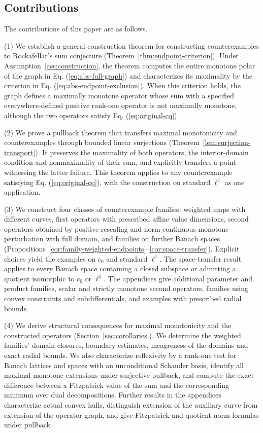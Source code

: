 \documentclass[11pt]{article}
\theoremstyle{definition}
\theoremstyle{remark}
\begin{document}
\subsection{Contributions}
The contributions of this paper are as follows. 

(1) We establish a general construction theorem for constructing counterexamples to Rockafellar's sum conjecture (Theorem~\ref{thm:endpoint-criterion}). Under Assumption~\ref{ass:construction}, the theorem computes the entire monotone polar of the graph in Eq. (\ref{eq:abs-full-graph}) and characterizes its maximality by the criterion in Eq. (\ref{eq:abs-endpoint-exclusion}). When this criterion holds, the graph defines a maximally monotone operator whose sum with a specified everywhere-defined positive rank-one operator is not maximally monotone, although the two operators satisfy Eq. (\ref{eq:original-cq}).

(2) We prove a pullback theorem that transfers maximal monotonicity and counterexamples through bounded linear surjections (Theorem~\ref{lem:surjection-transport}). It preserves the maximality of both operators, the interior-domain condition and nonmaximality of their sum, and explicitly transfers a point witnessing the latter failure. This theorem applies to any counterexample satisfying Eq. (\ref{eq:original-cq}), with the construction on standard $\ell^1$ as one application.

(3) We construct four classes of counterexample families: weighted maps with different curves, first operators with prescribed affine value dimensions, second operators obtained by positive rescaling and norm-continuous monotone perturbation with full domain, and families on further Banach spaces (Propositions~\ref{cor:family-weighted-endpoints}--\ref{cor:space-transfer}). Explicit choices yield the examples on $c_0$ and standard $\ell^1$. The space-transfer result applies to every Banach space containing a closed subspace or admitting a quotient isomorphic to $c_0$ or $\ell^1$. The appendices give additional parameter and product families, scalar and strictly monotone second operators, families using convex constraints and subdifferentials, and examples with prescribed radial bounds.

(4) We derive structural consequences for maximal monotonicity and the constructed operators (Section~\ref{sec:corollaries}). We determine the weighted families' domain closures, boundary estimates, meagreness of the domains and exact radial bounds. We also characterize reflexivity by a rank-one test for Banach lattices and spaces with an unconditional Schauder basis, identify all maximal monotone extensions under surjective pullback, and compute the exact difference between a Fitzpatrick value of the sum and the corresponding minimum over dual decompositions. Further results in the appendices characterize actual convex hulls, distinguish extension of the auxiliary curve from extension of the operator graph, and give Fitzpatrick and quotient-norm formulas under pullback.
\end{document}

